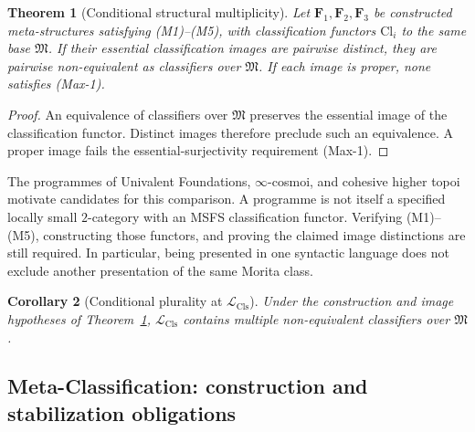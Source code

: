 \documentclass[11pt]{article}
\theoremstyle{plain}
\newtheorem{theorem}{Theorem}[section]
\newtheorem{corollary}[theorem]{Corollary}
\theoremstyle{definition}
\newcommand{\fM}{\mathfrak{M}}
\newcommand{\LCls}{\mathcal{L}_{\mathrm{Cls}}}
\newcommand{\Cl}{\mathrm{Cl}}
\begin{document}
\begin{theorem}[Conditional structural multiplicity]\label{thm:meta-mult}
Let $\mathbf F_1,\mathbf F_2,\mathbf F_3$ be constructed meta-structures satisfying (M1)--(M5), with classification functors $\Cl_i$ to the same base $\fM$. If their essential classification images are pairwise distinct, they are pairwise non-equivalent as classifiers over $\fM$. If each image is proper, none satisfies (Max-1).
\end{theorem}
\begin{proof}
An equivalence of classifiers over $\fM$ preserves the essential image of the classification functor. Distinct images therefore preclude such an equivalence. A proper image fails the essential-surjectivity requirement (Max-1).
\end{proof}
The programmes of Univalent Foundations, $\infty$-cosmoi, and cohesive higher topoi motivate candidates for this comparison. A programme is not itself a specified locally small $2$-category with an MSFS classification functor. Verifying (M1)--(M5), constructing those functors, and proving the claimed image distinctions are still required. In particular, being presented in one syntactic language does not exclude another presentation of the same Morita class.

\begin{corollary}[Conditional plurality at $\LCls$]\label{cor:plurality}
Under the construction and image hypotheses of Theorem~\ref{thm:meta-mult}, $\LCls$ contains multiple non-equivalent classifiers over $\fM$.
\end{corollary}

\subsection{Meta-Classification: construction and stabilization obligations}
\end{document}
